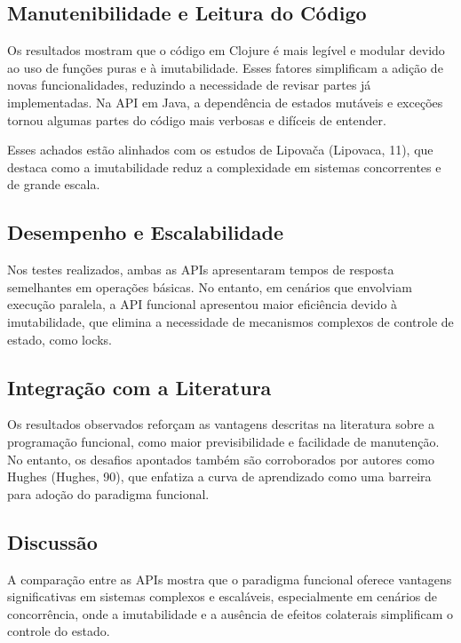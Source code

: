 \subsection{Manutenibilidade e Leitura do Código}

Os resultados mostram que o código em Clojure é mais legível e modular devido ao uso de funções puras e à imutabilidade. Esses fatores simplificam a adição de novas funcionalidades, reduzindo a necessidade de revisar partes já implementadas. Na API em Java, a dependência de estados mutáveis e exceções tornou algumas partes do código mais verbosas e difíceis de entender.

Esses achados estão alinhados com os estudos de Lipovača (Lipovaca, 11), que destaca como a imutabilidade reduz a complexidade em sistemas concorrentes e de grande escala.

\subsection{Desempenho e Escalabilidade}

Nos testes realizados, ambas as APIs apresentaram tempos de resposta semelhantes em operações básicas. No entanto, em cenários que envolviam execução paralela, a API funcional apresentou maior eficiência devido à imutabilidade, que elimina a necessidade de mecanismos complexos de controle de estado, como locks. 

\subsection{Integração com a Literatura}

Os resultados observados reforçam as vantagens descritas na literatura sobre a programação funcional, como maior previsibilidade e facilidade de manutenção. No entanto, os desafios apontados também são corroborados por autores como Hughes (Hughes, 90), que enfatiza a curva de aprendizado como uma barreira para adoção do paradigma funcional.

\subsection{Discussão}

A comparação entre as APIs mostra que o paradigma funcional oferece vantagens significativas em sistemas complexos e escaláveis, especialmente em cenários de concorrência, onde a imutabilidade e a ausência de efeitos colaterais simplificam o controle do estado.

